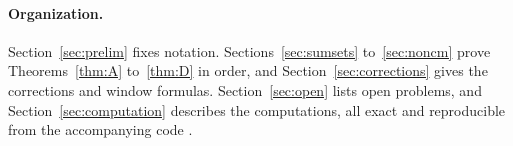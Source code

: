 \paragraph{Organization.} Section~\ref{sec:prelim} fixes notation. Sections~\ref{sec:sumsets} to~\ref{sec:noncm} prove Theorems~\ref{thm:A} to~\ref{thm:D} in order, and Section~\ref{sec:corrections} gives the corrections and window formulas. Section~\ref{sec:open} lists open problems, and Section~\ref{sec:computation} describes the computations, all exact and reproducible from the accompanying code \cite{code2026}.
